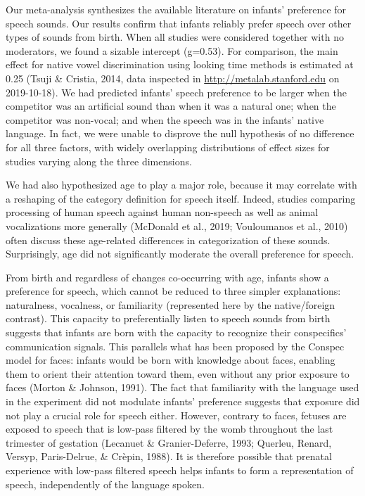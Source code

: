 \documentclass[man]{apa6}
\begin{document}
Our meta-analysis synthesizes the available literature on infants'
preference for speech sounds. Our results confirm that infants reliably
prefer speech over other types of sounds from birth. When all studies
were considered together with no moderators, we found a sizable
intercept (g=0.53). For comparison, the main effect for native vowel
discrimination using looking time methods is estimated at 0.25 (Tsuji \&
Cristia, 2014, data inspected in \url{http://metalab.stanford.edu} on
2019-10-18). We had predicted infants' speech preference to be larger
when the competitor was an artificial sound than when it was a natural
one; when the competitor was non-vocal; and when the speech was in the
infants' native language. In fact, we were unable to disprove the null
hypothesis of no difference for all three factors, with widely
overlapping distributions of effect sizes for studies varying along the
three dimensions.

We had also hypothesized age to play a major role, because it may
correlate with a reshaping of the category definition for speech itself.
Indeed, studies comparing processing of human speech against human
non-speech as well as animal vocalizations more generally (McDonald et
al., 2019; Vouloumanos et al., 2010) often discuss these age-related
differences in categorization of these sounds. Surprisingly, age did not
significantly moderate the overall preference for speech.

From birth and regardless of changes co-occurring with age, infants show
a preference for speech, which cannot be reduced to three simpler
explanations: naturalness, vocalness, or familiarity (represented here
by the native/foreign contrast). This capacity to preferentially listen
to speech sounds from birth suggests that infants are born with the
capacity to recognize their conspecifics' communication signals. This
parallels what has been proposed by the Conspec model for faces: infants
would be born with knowledge about faces, enabling them to orient their
attention toward them, even without any prior exposure to faces (Morton
\& Johnson, 1991). The fact that familiarity with the language used in
the experiment did not modulate infants' preference suggests that
exposure did not play a crucial role for speech either. However,
contrary to faces, fetuses are exposed to speech that is low-pass
filtered by the womb throughout the last trimester of gestation
(Lecanuet \& Granier-Deferre, 1993; Querleu, Renard, Versyp,
Paris-Delrue, \& Crèpin, 1988). It is therefore possible that prenatal
experience with low-pass filtered speech helps infants to form a
representation of speech, independently of the language spoken.
\end{document}
